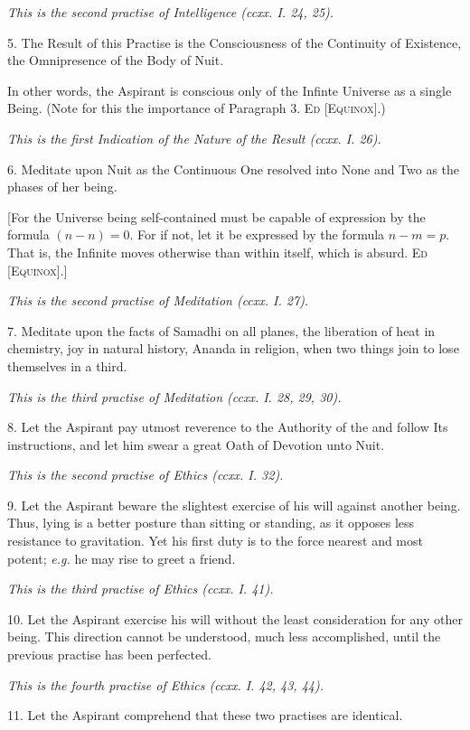 \textit{This is the second practise of Intelligence (ccxx. I. 24, 25).}

5. The Result of this Practise is the Consciousness of the Continuity of Existence, the Omnipresence of the Body of Nuit.

In other words, the Aspirant is conscious only of the Infinte Universe as a single Being. (Note for this the importance of Paragraph 3. \textsc{Ed [Equinox]}.)

\textit{This is the first Indication of the Nature of the Result (ccxx. I. 26).}

6. Meditate upon Nuit as the Continuous One resolved into None and Two as the phases of her being.

[For the Universe being self-contained must be capable of expression by the formula $(n-n)=0$. For if not, let it be expressed by the formula $n-m=p$. That is, the Infinite moves otherwise than within itself, which is absurd. \textsc{Ed [Equinox]}.]

\textit{This is the second practise of Meditation (ccxx. I. 27).}

7. Meditate upon the facts of Samadhi on all planes, the liberation of heat in chemistry, joy in natural history, Ananda in religion, when two things join to lose themselves in a third.

\textit{This is the third practise of Meditation (ccxx. I. 28, 29, 30).}

8. Let the Aspirant pay utmost reverence to the Authority of the \Argentium{} and follow Its instructions, and let him swear a great Oath of Devotion unto Nuit.

\textit{This is the second practise of Ethics (ccxx. I. 32).}

9. Let the Aspirant beware the slightest exercise of his will against another being. Thus, lying is a better posture than sitting or standing, as it opposes less resistance to gravitation. Yet his first duty is to the force nearest and most potent; \textit{e.g.} he may rise to greet a friend.

\textit{This is the third practise of Ethics (ccxx. I. 41).}

10. Let the Aspirant exercise his will without the least consideration for any other being. This direction cannot be understood, much less accomplished, until the previous practise has been perfected.

\textit{This is the fourth practise of Ethics (ccxx. I. 42, 43, 44).}

11. Let the Aspirant comprehend that these two practises are identical.


